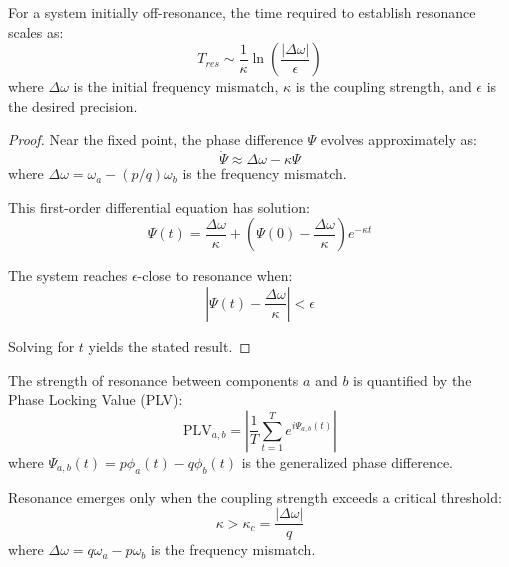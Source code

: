 \begin{theorem}
For a system initially off-resonance, the time required to establish resonance scales as:
\begin{equation}
T_{res} \sim \frac{1}{\kappa} \ln\left(\frac{|\Delta\omega|}{\epsilon}\right)
\end{equation}
where $\Delta\omega$ is the initial frequency mismatch, $\kappa$ is the coupling strength, and $\epsilon$ is the desired precision.
\end{theorem}

\begin{proof}
Near the fixed point, the phase difference $\Psi$ evolves approximately as:
\begin{equation}
\dot{\Psi} \approx \Delta\omega - \kappa\Psi
\end{equation}
where $\Delta\omega = \omega_a - (p/q)\omega_b$ is the frequency mismatch.

This first-order differential equation has solution:
\begin{equation}
\Psi(t) = \frac{\Delta\omega}{\kappa} + \left(\Psi(0) - \frac{\Delta\omega}{\kappa}\right)e^{-\kappa t}
\end{equation}

The system reaches $\epsilon$-close to resonance when:
\begin{equation}
\left|\Psi(t) - \frac{\Delta\omega}{\kappa}\right| < \epsilon
\end{equation}

Solving for $t$ yields the stated result.
\end{proof}

\begin{definition}
The strength of resonance between components $a$ and $b$ is quantified by the Phase Locking Value (PLV):
\begin{equation}
\text{PLV}_{a,b} = \left|\frac{1}{T} \sum_{t=1}^T e^{i\Psi_{a,b}(t)}\right|
\end{equation}
where $\Psi_{a,b}(t) = p\phi_a(t) - q\phi_b(t)$ is the generalized phase difference.
\end{definition}

\begin{theorem}
Resonance emerges only when the coupling strength exceeds a critical threshold:
\begin{equation}
\kappa > \kappa_c = \frac{|\Delta\omega|}{q}
\end{equation}
where $\Delta\omega = q\omega_a - p\omega_b$ is the frequency mismatch.
\end{theorem}

